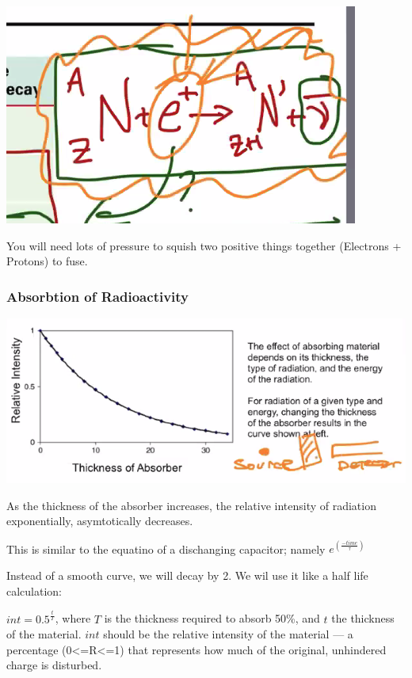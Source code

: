 \documentclass[letterpaper]{article}
\begin{document}
\begin{center}
\includegraphics[width=.9\linewidth]{positironcapture.png}
\end{center}

You will need lots of pressure to squish two positive things together
(Electrons + Protons) to fuse.

\subsubsection{Absorbtion of Radioactivity}
\label{sec:org50c0893}
\begin{center}
\includegraphics[width=.9\linewidth]{absorbtion.png}
\end{center}

As the thickness of the absorber increases, the relative intensity of
radiation exponentially, asymtotically decreases.

This is similar to the equatino of a dischanging capacitor; namely
\(e^(\frac{-time}{\tau})\)

Instead of a smooth curve, we will decay by 2. We wil use it like a half
life calculation:

\(int = 0.5^{\frac{t}{T}}\), where \(T\) is the thickness required to
absorb 50\%, and \(t\) the thickness of the material. \(int\) should be
the relative intensity of the material --- a percentage (0<=R<=1) that
represents how much of the original, unhindered charge is disturbed.
\end{document}
